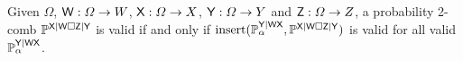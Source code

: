 


\begin{theorem}\label{th:extension_2comb_valid}
Given $\Omega$, $\mathsf{W}:\Omega\to W$, $\mathsf{X}:\Omega\to X$, $\mathsf{Y}:\Omega\to Y$ and $\mathsf{Z}:\Omega\to Z$, a probability 2-comb $\mathbb{P}^{\mathsf{X}|\mathsf{W}\square\mathsf{Z}|\mathsf{Y}}$ is valid if and only if $\text{insert}(\mathbb{P}_\alpha^{\mathsf{Y}|\mathsf{WX}},\mathbb{P}^{\mathsf{X}|\mathsf{W}\square\mathsf{Z}|\mathsf{Y}})$ is valid for all valid $\mathbb{P}_\alpha^{\mathsf{Y}|\mathsf{WX}}$.
\end{theorem}


